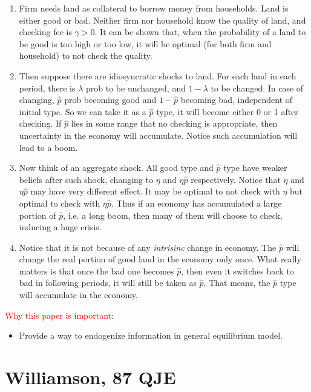 \documentclass{book}
\theoremstyle{plain}
\theoremstyle{definition}
\begin{document}
\begin{enumerate}
	\item Firm needs land as collateral to borrow money from households. Land is either good or bad. Neither firm nor household know the quality of land, and checking fee is $\gamma>0$. It can be shown that, when the probability of a land to be good is too high or too low, it will be optimal (for both firm and household) to not check the quality.
	\item Then suppose there are idiosyncratic shocks to land. For each land in each period, there is $\lambda$ prob to be unchanged, and $1-\lambda$ to be changed. In case of changing, $\hat p$ prob becoming good and $1-\hat p$ becoming bad, independent of initial type. So we can take it as a $\hat p$ type, it will become either 0 or 1 after checking. If $\hat p$ lies in some range that no checking is appropriate, then uncertainty in the economy will accumulate. Notice such accumulation will lead to a boom.
	\item Now think of an aggregate shock. All good type and $\hat p$ type have weaker beliefs after such shock, changing to $\eta$ and $\eta \hat p$ respectively. Notice that $\eta$ and $\eta \hat p$ may have very different effect. It may be optimal to not check with $\eta$ but optimal to check with $\eta \hat p$. Thus if an economy has accumulated a large portion of $\hat p$, i.e. a long boom, then many of them will choose to check, inducing a huge crisis.
	\item Notice that it is not because of any \textit{intrisinc} change in economy. The $\hat p$ will change the real portion of good land in the economy only once. What really matters is that once the bad one becomes $\hat p$, then even it switches back to bad in following periods, it will still be taken as $\hat p$. That means, the $\hat p$ type will accumulate in the economy.
\end{enumerate}

\textcolor{red}{Why this paper is important}:
\begin{itemize}
	\item Provide a way to endogenize information in general equilibrium model.
\end{itemize}



\section{Williamson, 87 QJE} %
\label{sec:williamson_87_qje}
\end{document}
